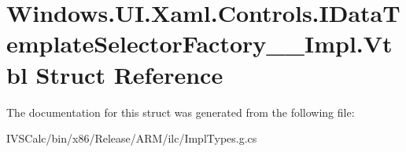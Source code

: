 \hypertarget{struct_windows_1_1_u_i_1_1_xaml_1_1_controls_1_1_i_data_template_selector_factory_____impl_1_1_vtbl}{}\section{Windows.\+U\+I.\+Xaml.\+Controls.\+I\+Data\+Template\+Selector\+Factory\+\_\+\+\_\+\+Impl.\+Vtbl Struct Reference}
\label{struct_windows_1_1_u_i_1_1_xaml_1_1_controls_1_1_i_data_template_selector_factory_____impl_1_1_vtbl}


The documentation for this struct was generated from the following file\+:\begin{DoxyCompactItemize}
\item 
I\+V\+S\+Calc/bin/x86/\+Release/\+A\+R\+M/ilc/Impl\+Types.\+g.\+cs\end{DoxyCompactItemize}
